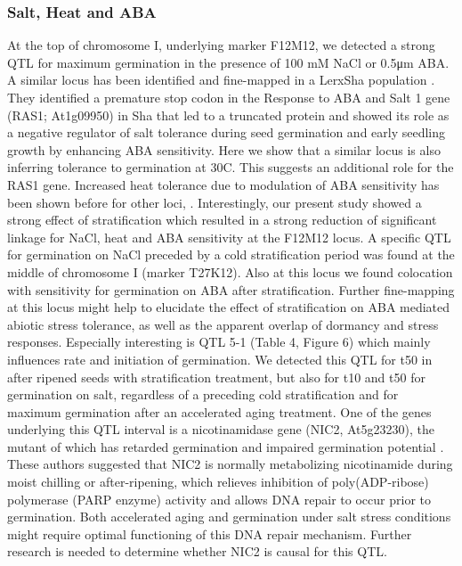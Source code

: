 \subsubsection{Salt, Heat and ABA}
At the top of chromosome I, underlying marker F12M12, we detected a strong QTL for maximum germination in 
the presence of 100 mM NaCl or 0.5μm ABA. A similar locus has been identified and fine-mapped in a 
LerxSha population \cite{Ren:2010}. They identified a premature stop codon in the Response to ABA and 
Salt 1 gene (RAS1; At1g09950) in Sha that led to a truncated protein and showed its role as a negative 
regulator of salt tolerance during seed germination and early seedling growth by enhancing ABA 
sensitivity. Here we show that a similar locus is also inferring tolerance to germination at 30\degree C. 
This suggests an additional role for the RAS1 gene. Increased heat tolerance due to modulation of 
ABA sensitivity has been shown before for other loci, \cite{Argyris:2008,Lee:2010}. 
Interestingly, our present study showed a strong effect of stratification which resulted in a strong 
reduction of significant linkage for NaCl, heat and ABA sensitivity at the F12M12 locus. A specific 
QTL for germination on NaCl preceded by a cold stratification period was found at the middle of 
chromosome I (marker T27K12). Also at this locus we found colocation with sensitivity for germination 
on ABA after stratification. Further fine-mapping at this locus might help to elucidate the effect 
of stratification on ABA mediated abiotic stress tolerance, as well as the apparent overlap of 
dormancy and stress responses. Especially interesting is QTL 5-1 (Table 4, Figure 6) which mainly 
influences rate and initiation of germination. We detected this QTL for t50 in after ripened seeds 
with stratification treatment, but also for t10 and t50 for germination on salt, regardless of a 
preceding cold stratification and for maximum germination after an accelerated aging treatment. 
One of the genes underlying this QTL interval is a nicotinamidase gene (NIC2, At5g23230), the mutant 
of which has retarded germination and impaired germination potential \cite{Hunt:2007}. These 
authors suggested that NIC2 is normally metabolizing nicotinamide during moist chilling or 
after-ripening, which relieves inhibition of poly(ADP-ribose) polymerase (PARP enzyme) activity and 
allows DNA repair to occur prior to germination. Both accelerated aging and germination under salt 
stress conditions might require optimal functioning of this DNA repair mechanism. Further research 
is needed to determine whether NIC2 is causal for this QTL.

